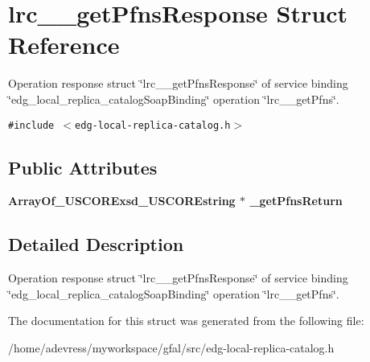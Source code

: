 \section{lrc\_\-\_\-get\-Pfns\-Response Struct Reference}
\label{structlrc____getPfnsResponse}
Operation response struct \char`\"{}lrc\_\-\_\-get\-Pfns\-Response\char`\"{} of service binding \char`\"{}edg\_\-local\_\-replica\_\-catalog\-Soap\-Binding\char`\"{} operation \char`\"{}lrc\_\-\_\-get\-Pfns\char`\"{}.  


{\tt \#include $<$edg-local-replica-catalog.h$>$}

\subsection*{Public Attributes}
\begin{CompactItemize}
\item 
\bf{Array\-Of\_\-USCORExsd\_\-USCOREstring} $\ast$ \textbf{\_\-get\-Pfns\-Return}\label{structlrc____getPfnsResponse_9621cb25f356e31c6b34e24163927b22}

\end{CompactItemize}


\subsection{Detailed Description}
Operation response struct \char`\"{}lrc\_\-\_\-get\-Pfns\-Response\char`\"{} of service binding \char`\"{}edg\_\-local\_\-replica\_\-catalog\-Soap\-Binding\char`\"{} operation \char`\"{}lrc\_\-\_\-get\-Pfns\char`\"{}. 



The documentation for this struct was generated from the following file:\begin{CompactItemize}
\item 
/home/adevress/myworkspace/gfal/src/edg-local-replica-catalog.h\end{CompactItemize}
